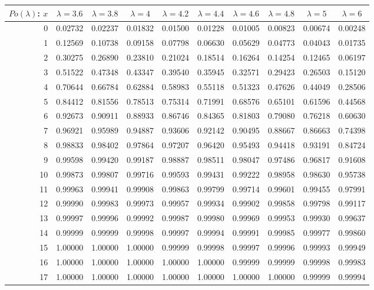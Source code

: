 \vspace{8pt minus 6pt}
\begin{tabular}{|r|c|c|c|c|c|c|c|c|c|}
\hline
$Po(\lambda)$: $x$
   & $\lambda=3.6$ & $\lambda=3.8$ & $\lambda=4$ & $\lambda=4.2$ & $\lambda=4.4$ & $\lambda=4.6$ & $\lambda=4.8$ & $\lambda=5$ & $\lambda=6$ \\\hline
  0&0.02732&0.02237&0.01832&0.01500&0.01228&0.01005&0.00823&0.00674&0.00248\\
  1&0.12569&0.10738&0.09158&0.07798&0.06630&0.05629&0.04773&0.04043&0.01735\\
  2&0.30275&0.26890&0.23810&0.21024&0.18514&0.16264&0.14254&0.12465&0.06197\\
  3&0.51522&0.47348&0.43347&0.39540&0.35945&0.32571&0.29423&0.26503&0.15120\\
  4&0.70644&0.66784&0.62884&0.58983&0.55118&0.51323&0.47626&0.44049&0.28506\\
  5&0.84412&0.81556&0.78513&0.75314&0.71991&0.68576&0.65101&0.61596&0.44568\\
  6&0.92673&0.90911&0.88933&0.86746&0.84365&0.81803&0.79080&0.76218&0.60630\\
  7&0.96921&0.95989&0.94887&0.93606&0.92142&0.90495&0.88667&0.86663&0.74398\\
  8&0.98833&0.98402&0.97864&0.97207&0.96420&0.95493&0.94418&0.93191&0.84724\\
  9&0.99598&0.99420&0.99187&0.98887&0.98511&0.98047&0.97486&0.96817&0.91608\\
 10&0.99873&0.99807&0.99716&0.99593&0.99431&0.99222&0.98958&0.98630&0.95738\\
 11&0.99963&0.99941&0.99908&0.99863&0.99799&0.99714&0.99601&0.99455&0.97991\\
 12&0.99990&0.99983&0.99973&0.99957&0.99934&0.99902&0.99858&0.99798&0.99117\\
 13&0.99997&0.99996&0.99992&0.99987&0.99980&0.99969&0.99953&0.99930&0.99637\\
 14&0.99999&0.99999&0.99998&0.99997&0.99994&0.99991&0.99985&0.99977&0.99860\\
 15&1.00000&1.00000&1.00000&0.99999&0.99998&0.99997&0.99996&0.99993&0.99949\\
 16&1.00000&1.00000&1.00000&1.00000&1.00000&0.99999&0.99999&0.99998&0.99983\\
 17&1.00000&1.00000&1.00000&1.00000&1.00000&1.00000&1.00000&0.99999&0.99994\\
\hline
\end{tabular}

